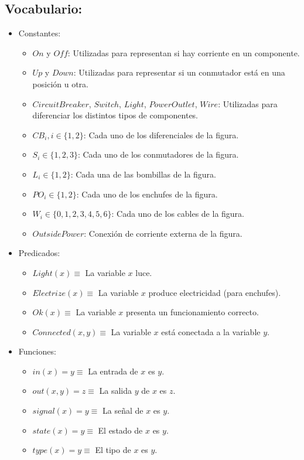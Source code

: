 \documentclass[10pt, a4paper,spanish]{article}
\begin{document}
		\subsection{Vocabulario:}
			\begin{itemize}
				\item Constantes:
				\begin{itemize}
					\item $On$ y $Off$: Utilizadas para  representan si hay corriente en un componente.
					\item $Up$ y $Down$: Utilizadas para representar si un conmutador está en una posición u otra.
					\item $CircuitBreaker$, $Switch$, $Light$, $PowerOutlet$, $Wire$: Utilizadas para diferenciar los distintos tipos de componentes.
					\item $CB_i, i \in \{1,2\}$: Cada uno de los diferenciales de la figura.
					\item $S_i \in \{1,2,3\}$:  Cada uno de los conmutadores de la figura.
					\item $L_i \in \{1,2\}$: Cada una de las bombillas de la figura.
					\item $PO_i \in \{1,2\}$: Cada uno de los enchufes de la figura.
					\item $W_i \in \{0,1,2,3,4,5,6\}$: Cada uno de los cables de la figura.
					\item $OutsidePower$: Conexión de corriente externa de la figura.
				\end{itemize}
				\item Predicados:
				\begin{itemize}
					\item $Light(x) \equiv$ La variable $x$ luce.
					\item $Electrize(x) \equiv$ La variable $x$ produce electricidad (para enchufes).
					\item $Ok(x) \equiv$ La variable $x$ presenta un funcionamiento correcto.
					\item $Connected(x, y) \equiv$ La variable $x$ está conectada a la variable $y$.
				\end{itemize}
				\item Funciones:
				\begin{itemize}
					\item $in(x) = y \equiv$ La entrada de $x$ es $y$.
					\item $out(x,y) = z \equiv$ La salida $y$ de $x$ es  $z$.
					\item $signal(x) = y \equiv$ La señal de $x$ es  $y $.
					\item $state(x) = y \equiv$ El estado de $x$ es $y$.
					\item $type(x) = y \equiv$ El tipo de $x$ es $y$.
				\end{itemize}
			\end{itemize}
\end{document}
